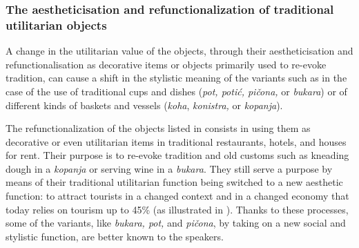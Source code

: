 \documentclass[output=paper]{LSP/langsci}
\begin{document}
\subsubsection{The aestheticisation and refunctionalization of traditional utilitarian objects}

A change in the utilitarian value of the objects, through their aestheticisation and refunctionalisation as decorative items or objects primarily used to re-evoke tradition, can cause a shift in the stylistic meaning of the variants such as in the case of the use of traditional cups and dishes (\textit{pot, potić, pičona, }or \textit{bukara}) or of different kinds of baskets and vessels (\textit{koha}, \textit{konistra,} or \textit{kopanja}). 

\begin{table}
\caption{The aestheticisation and refunctionalization of objects}
\label{tab:6}
\end{table}

The refunctionalization of the objects listed in  consists in using them as decorative or even utilitarian items in traditional restaurants, hotels, and houses for rent. Their purpose is to re-evoke tradition and old customs such as kneading dough in a \textit{kopanja }or serving wine in a \textit{bukara}. They still serve a purpose by means of their traditional utilitarian function being switched to a new aesthetic function: to attract tourists in a changed context and in a changed economy that today relies on tourism up to 45\% (as illustrated in ). Thanks to these processes, some of the variants, like \textit{bukara, pot,} and \textit{pičona}, by taking on a new social and stylistic function, are better known to the speakers. 
\end{document}
